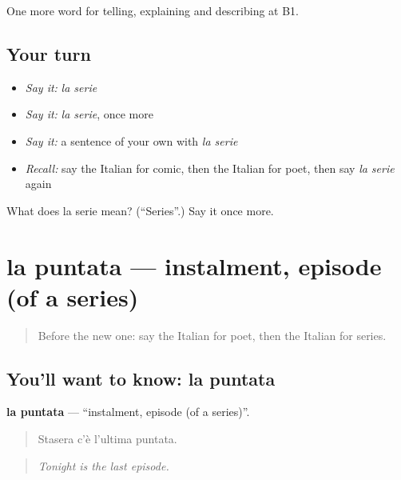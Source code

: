 \begin{grammarlens}[title={What you've built}]
One more word for telling, explaining and describing at B1.
\end{grammarlens}

\subsection*{Your turn}
\begin{itemize}
\raggedright
  \item \emph{Say it:} \emph{la serie}
  \item \emph{Say it:} \emph{la serie}, once more
  \item \emph{Say it:} a sentence of your own with \emph{la serie}
  \item \emph{Recall:} say the Italian for comic, then the Italian for poet, then say \emph{la serie} again
\end{itemize}

\begin{tcolorbox}[breakable,colback=teal!4,colframe=teal!35!black,title={Before you move on}]
What does la serie mean? (\textquotedblleft{}Series\textquotedblright{}.) Say it once more.
\end{tcolorbox}
\section[la puntata]{la puntata — instalment, episode (of a series)}

\label{lesson:IT-C528-puntata}



\begin{quote}
Before the new one: say the Italian for poet, then the Italian for series.
\end{quote}

\subsection*{You'll want to know: la puntata}
\textbf{la puntata} — \textquotedblleft{}instalment, episode (of a series)\textquotedblright{}.

\begin{quote}
Stasera c'è l'ultima puntata.
\end{quote}

\begin{quote}
\emph{Tonight is the last episode.}
\end{quote}

